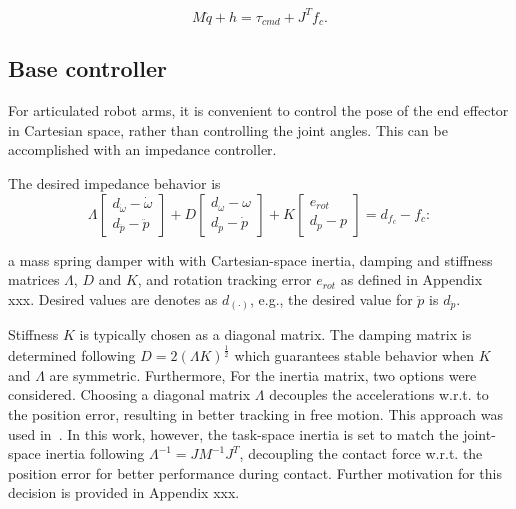 \documentclass[a4paper, 10pt, conference]{ieeeconf}
\begin{document}
    \begin{equation}
    M\ddot{q}+h=\tau_{cmd}+J^Tf_c.
    \end{equation}

    \subsection{Base controller}
    For articulated robot arms, it is convenient to control the pose of the end effector in Cartesian space, rather than controlling the joint angles. This can be accomplished with an impedance controller.

    The desired impedance behavior is
    \begin{equation} \label{eq:impedance_desired}
     \Lambda  \begin{bmatrix} d_{\dot{\omega}} - \dot{\omega}   \\ d_{\ddot{p}} - \ddot{p}  \end{bmatrix} + D \begin{bmatrix}d_\omega - {\omega} \\ d_{\dot{p}} - \dot{p} \end{bmatrix}  + K \begin{bmatrix} e_{rot} \\d_p - {p}  \end{bmatrix} = d_{f_c} -f_c:
     \end{equation} 

    a mass spring damper with with Cartesian-space inertia, damping and stiffness matrices $\Lambda$, $D$ and $K$, and rotation tracking error $e_{rot}$ as defined in Appendix xxx. Desired values are denotes as $d_{(\cdot)}$, e.g., the desired value for $\ddot{p}$ is  $d_{\ddot{p}}$.

    Stiffness $K$ is typically chosen as a diagonal matrix. The damping matrix is determined following $D = 2(\Lambda K)^{\frac{1}{2}}$ which guarantees stable behavior when $K$ and $\Lambda$ are symmetric. Furthermore, For the inertia matrix, two options were considered. Choosing a diagonal matrix $\Lambda$ decouples the accelerations w.r.t. to the position error, resulting in better tracking in free motion. This approach was used in~\cite{vanoorschotDesignNumericalValidation2022}. In this work, however, the task-space inertia is set to match the joint-space inertia following $\Lambda^{-1} = JM^{-1}J^T$, decoupling the contact force w.r.t. the position error for better performance during contact. Further motivation for this decision is provided in Appendix xxx. %
\end{document}
